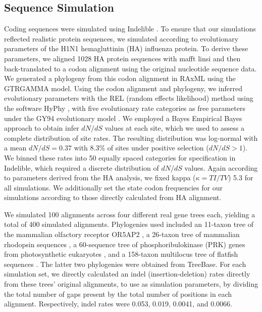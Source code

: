 \documentclass[10pt]{article}
\begin{document}
\subsection*{Sequence Simulation}
Coding sequences were simulated using Indelible \citep{Fletcher2009}. To ensure that our simulations reflected realistic protein sequences, we simulated according to evolutionary parameters of the H1N1 hemagluttinin (HA) influenza protein. To derive these parameters, we aligned 1028 HA protein sequences with mafft linsi \citep{Katoh2005} and then back-translated to a codon alignment using the original nucleotide sequence data. We generated a phylogeny from this codon alignment in RAxML \citep{Stamatakis2006} using the GTRGAMMA model. Using the codon alignment and phylogeny, we inferred evolutionary parameters with the REL (random effects likelihood)  method \citep{NielsenYang1998} using the software HyPhy \citep{Pond2005}, with five evolutionary rate categories as free parameters under the GY94 evolutionary model \citep{GoldmanYang1994}. We employed a Bayes Empirical Bayes approach \citep{Yang2000} to obtain infer $dN/dS$ values at each site, which we used to assess a complete distribution of site rates. The resulting distribution was log-normal with a mean $dN/dS = 0.37$ with 8.3\% of sites  under positive selection ($dN/dS>1$). We binned these rates into 50 equally spaced categories for specification in Indelible, which required a discrete distribution of $dN/dS$ values. Again according to parameters derived from the HA analysis, we fixed kappa ($\kappa = TI/TV$) 5.3 for all simulations. We additionally set the state codon frequencies for our simulations according to those directly calculated from HA alignment. 

We simulated 100 alignments across four different real gene trees each, yielding a total of 400 simulated alignments. Phylogenies used included an 11-taxon tree of the mammalian olfactory receptor OR5AP2 \citep{Spielman2013}, a 26-taxon tree of mammalian rhodopsin sequences \citep{Spielman2013}, a 60-sequence tree of phosphoribulokinase (PRK) genes from photosynthetic eukaryotes \citep{Yang2011}, and a 158-taxon multilocus tree of flatfish sequences \citep{Betancur2013}. The latter two phylogenies were obtained from TreeBase.
For each simulation set, we directly calculated an indel (insertion-deletion) rates directly from these trees’ original alignments, to use as simulation parameters, by dividing the total number of gaps present by the total number of positions in each alignment. Respectively, indel rates were 0.053, 0.019, 0.0041, and 0.0066. 
\end{document}
